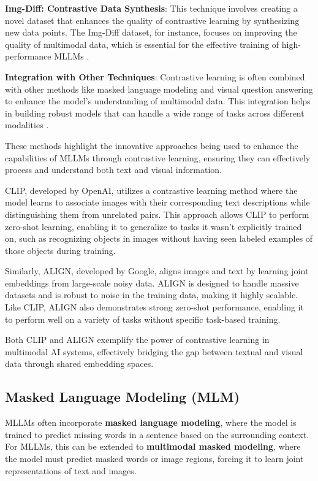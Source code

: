 \textbf{Img-Diff: Contrastive Data Synthesis}: This technique involves creating a novel dataset that enhances the quality of contrastive learning by synthesizing new data points. The Img-Diff dataset, for instance, focuses on improving the quality of multimodal data, which is essential for the effective training of high-performance MLLMs \cite{cite3}.

\textbf{Integration with Other Techniques}: Contrastive learning is often combined with other methods like masked language modeling and visual question answering to enhance the model's understanding of multimodal data. This integration helps in building robust models that can handle a wide range of tasks across different modalities \cite{cite4}.

These methods highlight the innovative approaches being used to enhance the capabilities of MLLMs through contrastive learning, ensuring they can effectively process and understand both text and visual information.

CLIP, developed by OpenAI, utilizes a contrastive learning method where the model learns to associate images with their corresponding text descriptions while distinguishing them from unrelated pairs. This approach allows CLIP to perform zero-shot learning, enabling it to generalize to tasks it wasn't explicitly trained on, such as recognizing objects in images without having seen labeled examples of those objects during training.

Similarly, ALIGN, developed by Google, aligns images and text by learning joint embeddings from large-scale noisy data. ALIGN is designed to handle massive datasets and is robust to noise in the training data, making it highly scalable. Like CLIP, ALIGN also demonstrates strong zero-shot performance, enabling it to perform well on a variety of tasks without specific task-based training.

Both CLIP and ALIGN exemplify the power of contrastive learning in multimodal AI systems, effectively bridging the gap between textual and visual data through shared embedding spaces.

\subsection{Masked Language Modeling (MLM)}

MLLMs often incorporate \textbf{masked language modeling}, where the model is trained to predict missing words in a sentence based on the surrounding context. For MLLMs, this can be extended to \textbf{multimodal masked modeling}, where the model must predict masked words or image regions, forcing it to learn joint representations of text and images.

